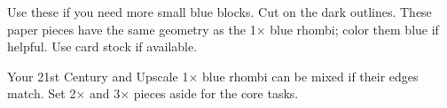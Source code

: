 \documentclass[12pt]{article}
\begin{document}
Use these if you need more small blue blocks. Cut on the dark outlines. These paper pieces have the same geometry as the 1\(\times\) blue rhombi; color them blue if helpful. Use card stock if available.
\vspace{.3in}
\begin{center}\end{center}
\vspace{.25in}
Your 21st Century and Upscale 1\(\times\) blue rhombi can be mixed if their edges match. Set 2\(\times\) and 3\(\times\) pieces aside for the core tasks.
\ScaleCheck
\end{document}
